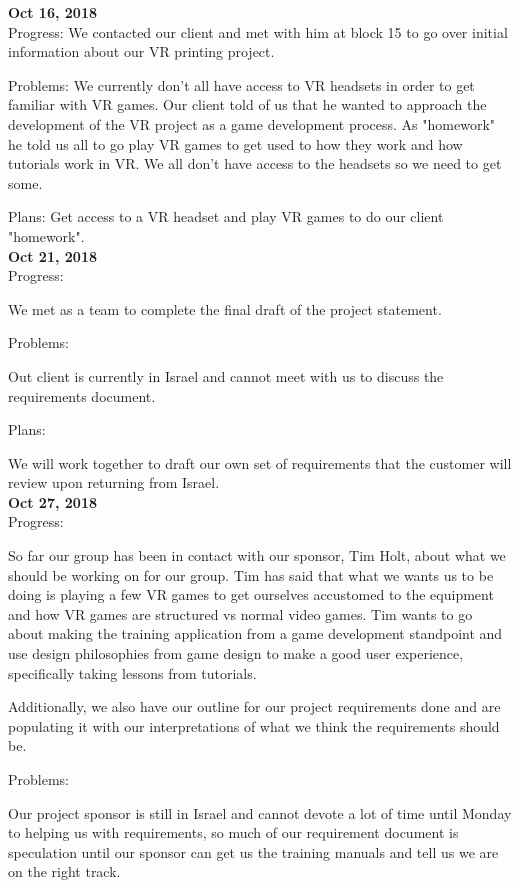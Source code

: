 \textbf{Oct 16, 2018}\\
Progress: We contacted our client and met with him at block 15 to go over initial information about our VR printing project.

Problems: We currently don't all have access to VR headsets in order to get familiar with VR games. Our client told of us that he wanted to approach the development of the VR project as a game development process. As "homework" he told us all to go play VR games to get used to how they work and how tutorials work in VR. We all don't have access to the headsets so we need to get some.

Plans: Get access to a VR headset and play VR games to do our client "homework".\\

\textbf{Oct 21, 2018}\\
Progress:

We met as a team to complete the final draft of the project statement.

Problems:

Out client is currently in Israel and cannot meet with us to discuss the requirements document.

Plans:

We will work together to draft our own set of requirements that the customer will review upon returning from Israel.\\


\textbf{Oct 27, 2018}\\
Progress:

So far our group has been in contact with our sponsor, Tim Holt, about what we should be working on for our group. Tim has said that what we wants us to be doing is playing a few VR games to get ourselves accustomed to the equipment and how VR games are structured vs normal video games. Tim wants to go about making the training application from a game development standpoint and use design philosophies from game design to make a good user experience, specifically taking lessons from tutorials.

Additionally, we also have our outline for our project requirements done and are populating it with our interpretations of what we think the requirements should be.

Problems:

Our project sponsor is still in Israel and cannot devote a lot of time until Monday to helping us with requirements, so much of our requirement document is speculation until our sponsor can get us the training manuals and tell us we are on the right track.

